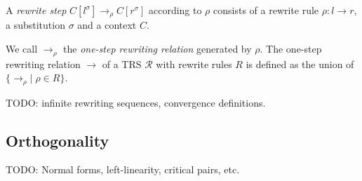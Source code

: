\begin{definition}
A \emph{rewrite step} $C[l^\sigma] \rightarrow_\rho C[r^\sigma]$ according to
$\rho$ consists of a rewrite rule $\rho : l \rightarrow r$, a substitution
$\sigma$ and a context $C$.
\end{definition}

We call $\rightarrow_\rho$ the \emph{one-step rewriting relation} generated by
$\rho$. The one-step rewriting relation $\rightarrow$ of a TRS $\mathcal{R}$
with rewrite rules $R$ is defined as the union of $\{ \rightarrow_\rho | \;
\rho \in R \}$.

TODO: infinite rewriting sequences, convergence definitions.


\subsection{Orthogonality}

TODO: Normal forms, left-linearity, critical pairs, etc.
